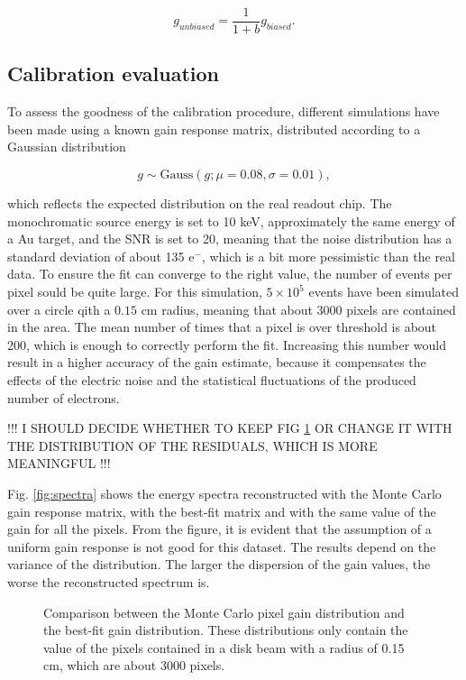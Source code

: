 \begin{equation}
g_{unbiased}   = \frac{1}{1 + b} g_{biased}.
\end{equation}

\subsection{Calibration evaluation}
To assess the goodness of the calibration procedure, different simulations have been made using a known gain response matrix, distributed according to a Gaussian distribution

\begin{equation}
g \sim \textrm{Gauss}(g; \mu = 0.08, \sigma = 0.01),
\end{equation}

which reflects the expected distribution on the real readout chip. The monochromatic source energy is set to 10 keV, approximately the same energy of a Au target, and the SNR is set to 20, meaning that the noise distribution has a standard deviation of about 135 e$^-$, which is a bit more pessimistic than the real data. To ensure the fit can converge to the right value, the number of events per pixel sould be quite large. For this simulation, $5\times 10^5$ events have been simulated over a circle qith a $0.15$ cm radius, meaning that about 3000 pixels are contained in the area. The mean number of times that a pixel is over threshold is about 200, which is enough to correctly perform the fit. Increasing this number would result in a higher accuracy of the gain estimate, because it compensates the effects of the electric noise and the statistical fluctuations of the produced number of electrons.

!!! I SHOULD DECIDE WHETHER TO KEEP FIG \ref{fig:gain_distribution} OR CHANGE IT WITH THE DISTRIBUTION OF THE RESIDUALS, WHICH IS MORE MEANINGFUL !!!

Fig. \ref{fig:spectra} shows the energy spectra reconstructed with the Monte Carlo gain response matrix, with the best-fit matrix and with the same value of the gain for all the pixels. From the figure, it is evident that the assumption of a uniform gain response is not good for this dataset. The results depend on the variance of the distribution. The larger the dispersion of the gain values, the worse the reconstructed spectrum is.


\begin{figure}
    \centering
    \caption{Comparison between the Monte Carlo pixel gain distribution and the best-fit gain distribution. These distributions only contain the value of the pixels contained in a disk beam with a radius of 0.15 cm, which are about 3000 pixels.}
    \label{fig:gain_distribution}
\end{figure}

